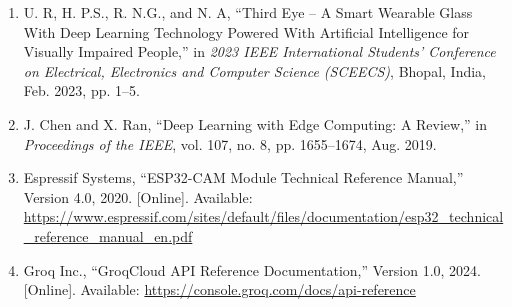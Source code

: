 \begin{enumerate}[leftmargin=1.5cm]
\item U. R, H. P.S., R. N.G., and N. A, ``Third Eye -- A Smart Wearable Glass With Deep Learning Technology Powered With Artificial Intelligence for Visually Impaired People,'' in \textit{2023 IEEE International Students' Conference on Electrical, Electronics and Computer Science (SCEECS)}, Bhopal, India, Feb. 2023, pp. 1--5.

\item J. Chen and X. Ran, ``Deep Learning with Edge Computing: A Review,'' in \textit{Proceedings of the IEEE}, vol. 107, no. 8, pp. 1655--1674, Aug. 2019.

\item Espressif Systems, ``ESP32-CAM Module Technical Reference Manual,'' Version 4.0, 2020. [Online]. Available: \url{https://www.espressif.com/sites/default/files/documentation/esp32_technical_reference_manual_en.pdf}

\item Groq Inc., ``GroqCloud API Reference Documentation,'' Version 1.0, 2024. [Online]. Available: \url{https://console.groq.com/docs/api-reference}
\end{enumerate}
